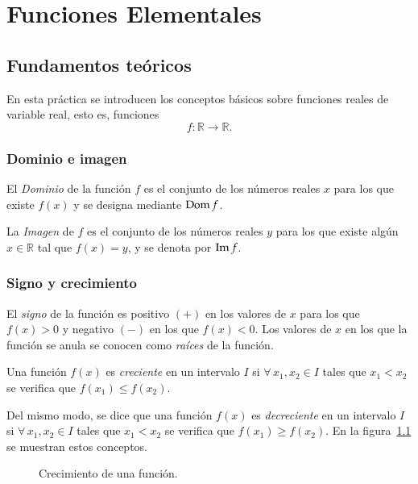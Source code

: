 \chapter{Funciones Elementales}

\section{Fundamentos teóricos}

En esta práctica se introducen los conceptos básicos sobre funciones reales de variable real, esto es, funciones
\[f:\mathbb{R}\rightarrow \mathbb{R}.\]

\subsection{Dominio e imagen}

El \emph{Dominio} de la función $f$ es el conjunto de los números
reales $x$ para los que existe $f(x)$ y se designa mediante $\operatorname{Dom}
f$.

La \emph{Imagen} de $f$ es el conjunto de los números reales $y$ para los que existe algún $x\in \mathbb{R}$ tal que $f(x)=y$, y se denota por $\operatorname{Im} f$.


\subsection{Signo y crecimiento}
El \emph{signo} de la función es positivo $(+)$ en los valores de $x$ para los que $f(x)>0$ y negativo $(-)$ en los que $f(x)<0$. Los valores de $x$ en los que la función se anula se conocen como \emph{raíces} de la función.

Una función $f(x)$ es \emph{creciente} en un intervalo $I$ si $\forall\, x_1, x_2 \in I$ tales que $x_1<x_2$ se verifica que $f(x_1)\leq f(x_2)$.

Del mismo modo, se dice que una función $f(x)$ es \emph{decreciente} en un intervalo $I$ si $\forall\, x_1, x_2 \in I$ tales que $x_1<x_2$ se verifica que $f(x_1)\geq f(x_2)$. En la figura~\ref{g:crecimiento} se muestran estos conceptos.

\begin{figure}[h!]
\centering {}\qquad
{}
\caption{Crecimiento de una función.}
\label{g:crecimiento}
\end{figure}


